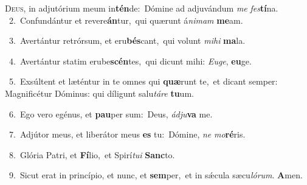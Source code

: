 \lettrine{\initial\textcolor{\initialcolor}{D}}{eus,} in adjutórium meum in\-\textbf{tén}\-de:~\star Dómine ad adjuvándum \textit{me} \textit{fes}\-\textbf{tí}na.\\
{\numbfont\textcolor{\numbcolor}{~2.}}~Confundántur et revere\-\textbf{án}\-tur,~\star qui quærunt á\-\textit{ni}\-\textit{mam} \textbf{me}\-am.\par
{\numbfont\textcolor{\numbcolor}{~3.}}~Avertántur retrórsum, et eru\-\textbf{bés}\-cant,~\star qui volunt \textit{mi}\-\textit{hi} \textbf{ma}\-la.\par
{\numbfont\textcolor{\numbcolor}{~4.}}~Avertántur statim erube\-\textbf{scén}\-tes,~\star qui dicunt mihi: \textit{Eu}\-\textit{ge}, \textbf{eu}\-ge.\par
{\numbfont\textcolor{\numbcolor}{~5.}}~Exsúltent et læténtur in te omnes qui \textbf{quæ}\-runt te,~\star et dicant semper: Magnificétur Dóminus: qui díligunt salu\-\textit{tá}\-\textit{re} \textbf{tu}\-um.\par
{\numbfont\textcolor{\numbcolor}{~6.}}~Ego vero egénus, et \textbf{pau}\-per sum:~\star Deus, \textit{ád}\-\textit{ju}\textbf{va} me.\par
{\numbfont\textcolor{\numbcolor}{~7.}}~Adjútor meus, et liberátor meus \textbf{es} tu:~\star Dómine, \textit{ne} \textit{mo}\-\textbf{ré}ris.\par
{\numbfont\textcolor{\numbcolor}{~8.}}~Glória Patri, et \textbf{Fí}\-lio,~\star et Spirí\-\textit{tu}\-\textit{i} \textbf{Sanc}\-to.\par
{\numbfont\textcolor{\numbcolor}{~9.}}~Sicut erat in princípio, et nunc, et \textbf{sem}\-per,~\star et in sǽcula sæcu\-\textit{ló}\-\textit{rum}. \textbf{A}\-men.\par
